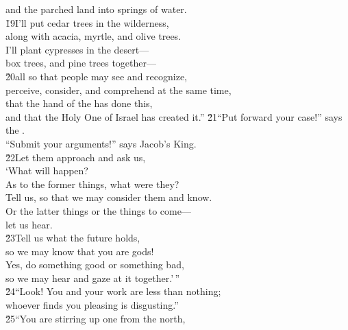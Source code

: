\begin{poetry}
\poemll    and the parched land into springs of water. \\
\poeml \v{19}I'll put cedar trees in the wilderness, \\
\poemll    along with acacia, myrtle, and olive trees. \\
\poeml I'll plant cypresses in the desert--- \\
\poemll    box trees, and pine trees together--- \\
\poeml \v{20}all so that people may see and recognize, \\
\poemll    perceive, consider, and comprehend at the same time, \\
\poeml that the hand of the  has done this, \\
\poemll    and that the Holy One of Israel has created it.''
\poeml \v{21}``Put forward your case!'' says the . \\
\poemll    ``Submit your arguments!'' says Jacob's King. \\
\poeml \v{22}Let them approach and ask us, \\
\poemll    `What will happen? \\
\poeml As to the former things, what were they? \\
\poemll    Tell us, so that we may consider them and know. \\
\poeml Or the latter things or the things to come--- \\
\poemlll       let us hear. \\
\poeml \v{23}Tell us what the future holds, \\
\poemll    so we may know that you are gods! \\
\poeml Yes, do something good or something bad, \\
\poemll    so we may hear and gaze at it together.'\,'' \\
\poeml \v{24}``Look! You and your work are less than nothing; \\
\poemll    whoever finds you pleasing is disgusting.'' \\
\poeml \v{25}``You are stirring up one from the north, \\

\end{poetry}

